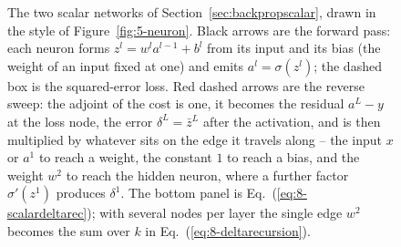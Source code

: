 \begin{figure}[htbp]
\caption{The two scalar networks of Section~\ref{sec:backpropscalar}, drawn
in the style of Figure~\ref{fig:5-neuron}.  Black arrows are the forward pass:
each neuron forms $z^{l}=w^{l}a^{l-1}+b^{l}$ from its input and its bias
(the weight of an input fixed at one) and emits $a^{l}=\sigma(z^{l})$; the
dashed box is the squared-error loss.  Red dashed arrows are the reverse
sweep: the adjoint of the cost is one, it becomes the residual $a^{L}-y$ at
the loss node, the error $\delta^{L}=\bar z^{L}$ after the activation, and is
then multiplied by whatever sits on the edge it travels along -- the input
$x$ or $a^{1}$ to reach a weight, the constant $1$ to reach a bias, and the
weight $w^{2}$ to reach the hidden neuron, where a further factor
$\sigma'(z^{1})$ produces $\delta^{1}$.  The bottom panel is
Eq.~(\ref{eq:8-scalardeltarec}); with several nodes per layer the single
edge $w^{2}$ becomes the sum over $k$ in Eq.~(\ref{eq:8-deltarecursion}).}
\label{fig:8-scalargraph}
\end{figure}

